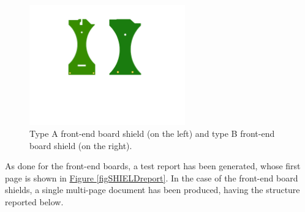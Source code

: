 \begin{figure}[h!]
    \centering
    \includegraphics[width=0.6\textwidth]{Images/chap2/shieldsPDFtwo.pdf}
    \caption{Type A front-end board shield (on the left) and type B front-end board shield (on the right).}
    \label{figShieldsAB}
\end{figure}
    

\par
As done for the front-end boards, a test report has been generated, whose first page is shown in \hyperref[figSHIELDreport]{Figure \ref{figSHIELDreport}}. In the case of the front-end board shields, a single multi-page document has been produced, having the structure reported below.

\begin{table}[ht]
    \centering
    \def\arraystretch{1.3}
    \caption{Structure of the entry for the front-end board shields test report.}
    \label{tabSHIELDstruct}
\end{table}
